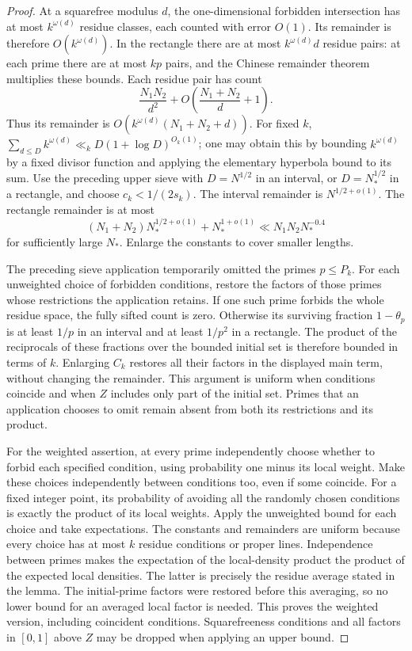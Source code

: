 \begin{proof}
At a squarefree modulus $d$, the one-dimensional forbidden intersection
has at most $k^{\omega(d)}$ residue classes, each counted with error $O(1)$.
Its remainder is therefore $O(k^{\omega(d)})$.  In the rectangle there are
at most $k^{\omega(d)}d$ residue pairs: at each prime there are at most
$kp$ pairs, and the Chinese remainder theorem multiplies these bounds.
Each residue pair has count
\[
 \frac{N_1N_2}{d^2}
          +O\left(\frac{N_1+N_2}{d}+1\right).
\]
Thus its remainder is
$O(k^{\omega(d)}(N_1+N_2+d))$.
For fixed $k$,
$\sum_{d\le D}k^{\omega(d)}\ll_k D(1+\log D)^{O_k(1)}$;
one may obtain this by bounding $k^{\omega(d)}$ by a fixed divisor function
and applying the elementary hyperbola bound to its sum.
Use the preceding upper sieve with $D=N^{1/2}$ in an interval, or
$D=N_*^{1/2}$ in a rectangle, and choose $c_k<1/(2s_k)$.
The interval remainder is $N^{1/2+o(1)}$.
The rectangle remainder is at most
\[
 (N_1+N_2)N_*^{1/2+o(1)}+N_*^{1+o(1)}
            \ll N_1N_2N_*^{-0.4}
\]
for sufficiently large $N_*$.  Enlarge the constants to cover smaller
lengths.

The preceding sieve application temporarily omitted the primes $p\le P_k$.
For each unweighted choice of forbidden conditions, restore the factors of
those primes whose restrictions the application retains.  If one such prime
forbids the whole residue space, the fully sifted count is zero.  Otherwise
its surviving fraction $1-\theta_p$ is at
least $1/p$ in an interval and at least $1/p^2$ in a rectangle.  The product
of the reciprocals of these fractions over the bounded initial set is
therefore bounded in terms of $k$.  Enlarging $C_k$ restores all their
factors in the displayed main term, without changing the remainder.  This
argument is uniform when conditions coincide and when $Z$ includes only
part of the initial set.  Primes that an application chooses to omit remain
absent from both its restrictions and its product.

For the weighted assertion, at every prime independently choose whether
to forbid each specified condition, using probability one minus its local
weight.  Make these choices independently between conditions too, even if
some coincide.  For a fixed integer point, its probability
of avoiding all the randomly chosen conditions is exactly the product of
its local weights.  Apply the unweighted bound for each choice and take
expectations.  The constants and remainders are uniform because every
choice has at most $k$ residue conditions or proper lines.  Independence
between primes makes the expectation of the local-density product the
product of the expected local densities.  The latter is precisely the residue average stated in
the lemma.  The initial-prime factors were restored before this averaging,
so no lower bound for an averaged local factor is needed.  This proves the
weighted version, including coincident conditions.
Squarefreeness conditions and all factors in $[0,1]$ above $Z$ may be
dropped when applying an upper bound.
\end{proof}

